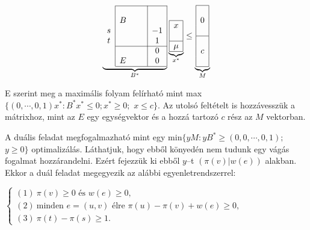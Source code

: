 \vspace{0.4cm}
\begin{wrapfigure}{L}{0.35\textwidth}
\begin{center}
\vspace{-1.3cm}
\begin{displaymath}
\underbrace{
\begin{array}{c|ccc|c|}
\cline{2-5}
&   & & & \\
&  B& & & \\
s &   & & &-1 \\
t &   & & & 1 \\
\cline{2-5}
&   & & & 0 \\
& E & & & 0 \\
\cline{2-5}
\end{array}}_{B^*}
\underbrace{
\begin{array}{|c|}
\hline
x\\
\\
\hline
\mu\\
\hline
\end{array}}_{x^*}
\leq
\underbrace{
\begin{array}{|c|}
\hline
\\
0\\
\\
\hline
\\
c\\
\\
\hline
\end{array}}_{M}
\end{displaymath}
\vspace{-1.3cm}
\end{center}
\end{wrapfigure}
E szerint meg a maximális folyam felírható mint max$\{ (0, \cdots,0,1)x^* : B^*x^* \leq
0; x^* \geq 0;$ $x \leq c \}$. Az utolsó feltételt is hozzávesszük a mátrixhoz,
mint az $E$ egy egységvektor és a hozzá tartozó $c$ rész az $M$ vektorban.

A duális feladat megfogalmazható mint egy min$\{ yM :yB^* \geq (0, 0, \cdots, 0,
1);$ $y \geq 0 \}$ optimalizálás. Láthatjuk, hogy ebből könyedén nem tudunk egy
vágás fogalmat hozzárandelni. Ezért fejezzük ki ebből $y$--t $\left(
\pi\left(v\right) | w\left(e\right)\right)$ alakban. Ekkor a duál feladat
megegyezik az alábbi egyenletrendszerrel:

$\begin{cases}
(1)~\pi(v) \geq 0 \mbox{ és } w(e) \geq 0, \\
(2)~\mbox{minden } e = (u,v) \mbox{ élre }  \pi(u)-\pi(v)+w(e) \geq 0, \\
(3)~\pi(t)-\pi(s) \geq 1. \end{cases}$

